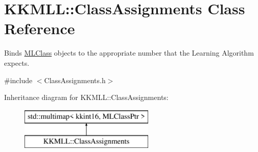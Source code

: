 \hypertarget{class_k_k_m_l_l_1_1_class_assignments}{}\section{K\+K\+M\+LL\+:\+:Class\+Assignments Class Reference}
\label{class_k_k_m_l_l_1_1_class_assignments}


Binds \hyperlink{class_k_k_m_l_l_1_1_m_l_class}{M\+L\+Class} objects to the appropriate number that the Learning Algorithm expects.  




{\ttfamily \#include $<$Class\+Assignments.\+h$>$}

Inheritance diagram for K\+K\+M\+LL\+:\+:Class\+Assignments\+:\begin{figure}[H]
\begin{center}
\leavevmode
\includegraphics[height=2.000000cm]{class_k_k_m_l_l_1_1_class_assignments}
\end{center}
\end{figure}
